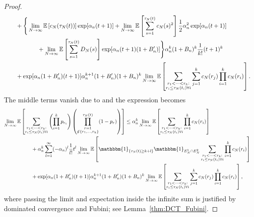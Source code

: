 \documentclass{article}
\newcommand{\E}{\mathbb{E}}
\newcommand{\I}[1]{\mathbbm{1}_{\{#1\}}}
\newcommand{\1}[1]{\mathbbm{1}_{#1}}
\begin{document}
\begin{proof}
\begin{align}
    &\qquad+ \Bigg\{  \lim_{N\to\infty} \E\left[ c_N(\tau_N(t)) \right]
        \exp[ \alpha_n (t+1) ]
        +  \lim_{N\to\infty} \E\left[ \sum_{s=1}^{\tau_N(t)} c_N(s)^2 \right]
        \frac{1}{2} \alpha_n^2 \exp[ \alpha_n (t+1) ] \notag\\
    &\hspace{2cm}+  \lim_{N\to\infty} 
        \E\left[ \sum_{s=1}^{\tau_N(t)} D_N(s) \right]
        \exp[ \alpha_n (t+1) (1+B_n^\prime) ] \Bigg\}
        \alpha_n^k (1 + B_n)^k \frac{1}{k!} (t+1)^k \notag\\
    &\qquad+ \exp[ \alpha_n (1 + B_n^\prime) (t+1) ]
        \alpha_n^{k+1} (1 + B_n^\prime) (1 + B_n)^k
         \lim_{N\to\infty} \E\left[ \sum_{\substack{r_1 <\dots< r_k 
        :\\ r_i \leq \tau_N(t_i) \forall i}}
        \sum_{j=1}^k c_N(r_j)
        \prod_{i=1}^k c_N(r_i) \right] . \label{eq:043}
\end{align}
The middle terms vanish due to \citet[Equations (3.3)--(3.5)]{brown2021} and the expression becomes
\begin{align}
\lim_{N\to\infty} \E &\left[ 
        \sum_{\substack{r_1 <\dots< r_k :\\ r_i \leq \tau_N(t_i) \forall i}}
        \left( \prod_{i=1}^k p_{r_i} \right)
        \left( \prod_{\substack{r=1 \\ \notin \{r_1,\dots,r_k\} }}^{\tau_N(t)} 
        (1-p_r) \right) \right]
\leq \alpha_n^k \lim_{N\to\infty} \E \left[
        \sum_{\substack{r_1 <\dots< r_k :\\ r_i \leq \tau_N(t_i) \forall i}}
        \prod_{i=1}^k c_N(r_i) \right] \notag\\
    &\qquad + \alpha_n^k
        \sum_{l=1}^{\infty} (-\alpha_n)^l \frac{1}{l!} t^l
        \lim_{N\to\infty} \E \left[ \I{\tau_N(t)\geq k+l} \1{E_N^1 \cap E_N^2}
        \sum_{\substack{r_1 <\dots< r_k :\\ r_i \leq \tau_N(t_i) \forall i}}
        \prod_{i=1}^k c_N(r_i) \right] \notag\\
    &\qquad+ \exp[ \alpha_n (1 + B_n^\prime) (t+1) ]
        \alpha_n^{k+1} (1 + B_n^\prime)
        (1 + B_n)^k \lim_{N\to\infty} \E \left[ 
        \sum_{\substack{r_1 <\dots< r_k :\\ r_i \leq \tau_N(t_i) \forall i}}
        \sum_{j=1}^k c_N(r_j)
        \prod_{i=1}^k c_N(r_i) \right] , \label{eq:040}
\end{align}
where passing the limit and expectation inside the infinite sum is justified by dominated convergence and Fubini; see Lemma~\ref{thm:DCT_Fubini}.

\end{proof}
\end{document}
